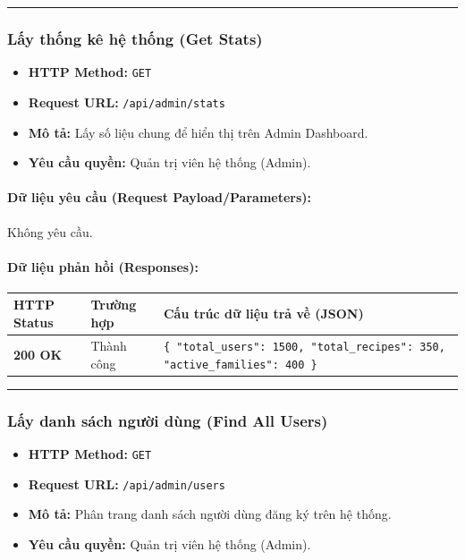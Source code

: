 \documentclass[12pt,a4paper]{article}
\begin{document}
\vskip 0.4cm
\noindent\rule{\textwidth}{0.3pt}
\vskip 0.4cm

\subsubsection{Lấy thống kê hệ thống (Get Stats)}
\begin{itemize}[leftmargin=*]
    \item \textbf{HTTP Method:} \texttt{GET}
    \item \textbf{Request URL:} \texttt{/api/admin/stats}
    \item \textbf{Mô tả:} Lấy số liệu chung để hiển thị trên Admin Dashboard.
    \item \textbf{Yêu cầu quyền:} Quản trị viên hệ thống (Admin).
\end{itemize}

\paragraph{Dữ liệu yêu cầu (Request Payload/Parameters):}
Không yêu cầu.\\

\paragraph{Dữ liệu phản hồi (Responses):}
\begin{longtable}{|p{2.8cm}|p{3.2cm}|p{8.0cm}|}
\hline
\textbf{HTTP Status} & \textbf{Trường hợp} & \textbf{Cấu trúc dữ liệu trả về (JSON)} \\ \hline
\endhead
\textbf{200 OK} & Thành công & \texttt{\{ "total\_users": 1500, "total\_recipes": 350, "active\_families": 400 \}} \\ \hline
\end{longtable}

\vskip 0.4cm
\noindent\rule{\textwidth}{0.3pt}
\vskip 0.4cm

\subsubsection{Lấy danh sách người dùng (Find All Users)}
\begin{itemize}[leftmargin=*]
    \item \textbf{HTTP Method:} \texttt{GET}
    \item \textbf{Request URL:} \texttt{/api/admin/users}
    \item \textbf{Mô tả:} Phân trang danh sách người dùng đăng ký trên hệ thống.
    \item \textbf{Yêu cầu quyền:} Quản trị viên hệ thống (Admin).
\end{itemize}
\end{document}
